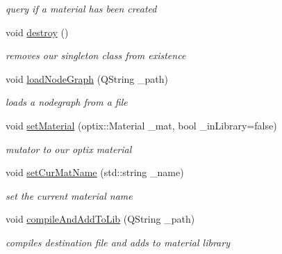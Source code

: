 \begin{DoxyCompactItemize}
\begin{DoxyCompactList}\small\item\em query if a material has been created \end{DoxyCompactList}\item 
\hypertarget{class_abstract_material_widget_a4c08ffa418405cfb09de9ce04716d21c}{void \hyperlink{class_abstract_material_widget_a4c08ffa418405cfb09de9ce04716d21c}{destroy} ()}\label{class_abstract_material_widget_a4c08ffa418405cfb09de9ce04716d21c}

\begin{DoxyCompactList}\small\item\em removes our singleton class from existence \end{DoxyCompactList}\item 
void \hyperlink{class_abstract_material_widget_ab697eed181925e2511b385b07ed13780}{load\-Node\-Graph} (Q\-String \-\_\-path)
\begin{DoxyCompactList}\small\item\em loads a nodegraph from a file \end{DoxyCompactList}\item 
\hypertarget{class_abstract_material_widget_a275ddde6f459273d70597e54896f0ba2}{void \hyperlink{class_abstract_material_widget_a275ddde6f459273d70597e54896f0ba2}{set\-Material} (optix\-::\-Material \-\_\-mat, bool \-\_\-in\-Library=false)}\label{class_abstract_material_widget_a275ddde6f459273d70597e54896f0ba2}

\begin{DoxyCompactList}\small\item\em mutator to our optix material \end{DoxyCompactList}\item 
\hypertarget{class_abstract_material_widget_aa5c700df91c81fae3ed650abb315ce43}{void \hyperlink{class_abstract_material_widget_aa5c700df91c81fae3ed650abb315ce43}{set\-Cur\-Mat\-Name} (std\-::string \-\_\-name)}\label{class_abstract_material_widget_aa5c700df91c81fae3ed650abb315ce43}

\begin{DoxyCompactList}\small\item\em set the current material name \end{DoxyCompactList}\item 
\hypertarget{class_abstract_material_widget_a965876cda41ec655a45c2c34d86a97ae}{void \hyperlink{class_abstract_material_widget_a965876cda41ec655a45c2c34d86a97ae}{compile\-And\-Add\-To\-Lib} (Q\-String \-\_\-path)}\label{class_abstract_material_widget_a965876cda41ec655a45c2c34d86a97ae}

\begin{DoxyCompactList}\small\item\em compiles destination file and adds to material library \end{DoxyCompactList}\end{DoxyCompactItemize}
